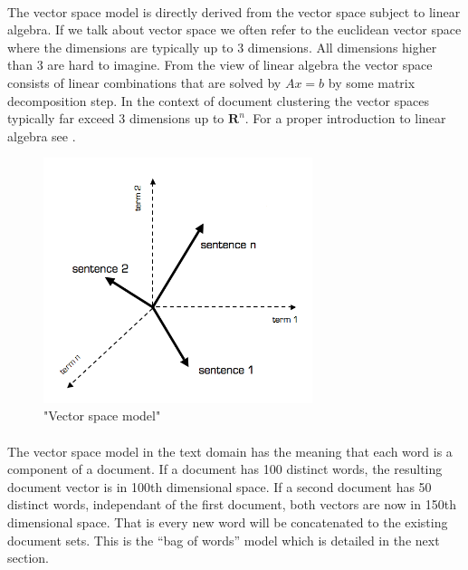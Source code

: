   \paragraph{}
    The vector space model is directly derived from the vector space subject to linear algebra. If we talk about vector space we often refer to the euclidean vector space where the dimensions are typically up to 3 dimensions. All dimensions higher than 3 are hard to imagine. From the view of linear algebra the vector space consists of linear combinations that are solved by $Ax = b$ by some matrix decomposition step. In the context of document clustering the vector spaces typically far exceed 3 dimensions up to $\mathbf{R}^{n}$. For a proper introduction to linear algebra see \cite{Strang2009}.

  \begin{figure}[h!]
    \centering
      \includegraphics[width=0.7\textwidth]{vsm.png}
      \caption{"Vector space model"}
      \label{vsm_pic}
  \end{figure}

  \paragraph{}
    The vector space model in the text domain has the meaning that each word is a component of a document. If a document has 100 distinct words, the resulting document vector is in 100th dimensional space. If a second document has 50 distinct words, independant of the first document, both vectors are now in 150th dimensional space. That is every new word will be concatenated to the existing document sets. This is the ``bag of words'' model which is detailed in the next section.

